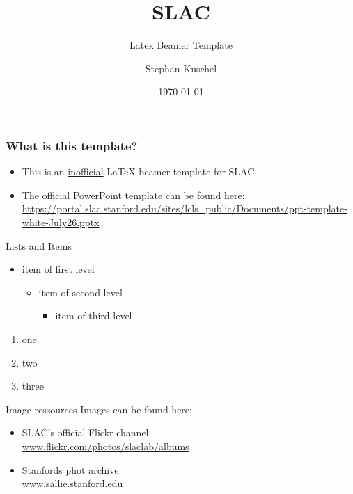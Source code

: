 \documentclass{beamer}
\title{SLAC}
\subtitle{Latex Beamer Template}
\author{Stephan Kuschel}
\institute{SLAC National Accelerator Laboratory}
\date{\today}
\begin{document}
\frame{\titlepage}


\begin{frame}
\frametitle{What is this template?}
\begin{itemize}
\item This is an \underline{inofficial} \LaTeX-beamer template for SLAC.
\item The official PowerPoint template can be found here: \\
\url{https://portal.slac.stanford.edu/sites/lcls_public/Documents/ppt-template-white-July26.pptx}
\end{itemize}
\end{frame}


\begin{frame}{Lists and Items}
  \begin{itemize}
    \item item of first level
    \begin{itemize}
      \item item of second level
      \begin{itemize}
        \item item of third level
      \end{itemize}
    \end{itemize}
  \end{itemize}
  \begin{enumerate}
    \item one
    \item two
    \item three
  \end{enumerate}
\end{frame}


\begin{frame}{Image ressources}
Images can be found here:
\begin{itemize}
  \item SLAC's official Flickr channel: \\
  \url{www.flickr.com/photos/slaclab/albums}
  \item Stanfords phot archive: \\
  \url{www.sallie.stanford.edu}
\end{itemize}
\end{frame}
\end{document}
